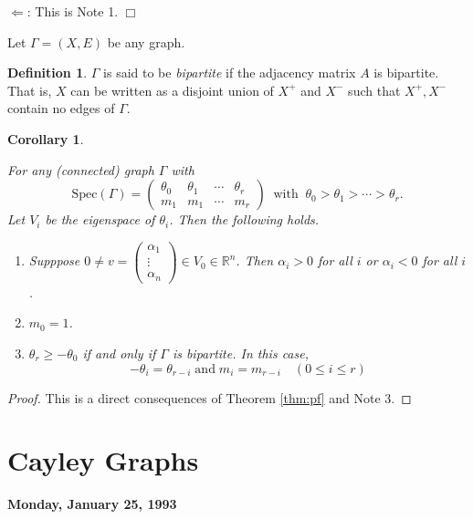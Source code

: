 \documentclass[
]{book}
\newtheorem{corollary}{Corollary}[chapter]
\theoremstyle{definition}
\newtheorem{definition}{Definition}[chapter]
\theoremstyle{definition}
\theoremstyle{definition}
\theoremstyle{definition}
\theoremstyle{remark}
\begin{document}
\(\Leftarrow\): This is Note 1.
\(\Box\)

Let \(\Gamma = (X, E)\) be any graph.

\begin{definition}
\(\Gamma\) is said to be \emph{bipartite} if the adjacency matrix \(A\) is bipartite. That is, \(X\) can be written as a disjoint union of \(X^+\) and \(X^-\) such that \(X^+, X^-\) contain no edges of \(\Gamma\).
\end{definition}

\begin{corollary}
\protect\hypertarget{cor:spec}{}\label{cor:spec}

For any (connected) graph \(\Gamma\) with
\[\mathrm{Spec}(\Gamma) = \begin{pmatrix}\theta_0 & \theta_1 &\cdots & \theta_r\\m_1 & m_1 & \cdots & m_r\end{pmatrix} \:\textrm{ with }\: \theta_0 > \theta_1 > \cdots > \theta_r.\]
Let \(V_i\) be the eigenspace of \(\theta_i\). Then the following holds.

\begin{enumerate}
\def\labelenumi{\arabic{enumi}.}
\item
  Supppose \(0\neq v = \begin{pmatrix} \alpha_1\\\vdots \\\alpha_n \end{pmatrix} \in V_0\in \mathbb{R}^n\). Then \(\alpha_i > 0\) for all \(i\) or \(\alpha_i < 0\) for all \(i\).
\item
  \(m_0 = 1\).
\item
  \(\theta_r \geq -\theta_0\) if and only if \(\Gamma\) is bipartite. In this case,
  \[-\theta_i = \theta_{r-i} \; \textrm{and} \; m_i = m_{r-i} \quad (0\leq i\leq r)\]
\end{enumerate}

\end{corollary}

\begin{proof}
This is a direct consequences of Theorem \ref{thm:pf} and Note 3.
\end{proof}

\hypertarget{lec3}{%
\chapter{Cayley Graphs}\label{lec3}}

\textbf{Monday, January 25, 1993}
\end{document}

